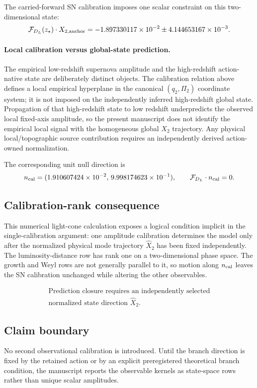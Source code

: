 The carried-forward SN calibration imposes one scalar constraint on this two-dimensional state:
\begin{equation}
\mathcal F_{D_L}(z_\star)\cdot X_{2,\rm anchor}=-1.897330117\times10^{-2}\pm4.144653167\times10^{-3}.
\end{equation}

\paragraph{Local calibration versus global-state prediction.}
The empirical low-redshift supernova amplitude and the high-redshift
action-native state are deliberately distinct objects.  The calibration
relation above defines a local empirical hyperplane in the canonical
$(q_2,\Pi_2)$ coordinate system; it is not imposed on the independently
inferred high-redshift global state.  Propagation of that high-redshift state
to low redshift underpredicts the observed local fixed-axis amplitude, so the
present manuscript does not identify the empirical local signal with the
homogeneous global $X_2$ trajectory.  Any physical local/topographic source
contribution requires an independently derived action-owned normalization.

The corresponding unit null direction is
\begin{equation}
n_{\rm cal}=(1.910607424\times10^{-2},\,9.998174623\times10^{-1}),\qquad \mathcal F_{D_L}\cdot n_{\rm cal}=0.
\end{equation}

\subsection{Calibration-rank consequence}
This numerical light-cone calculation exposes a logical condition implicit in the single-calibration argument: one amplitude calibration determines the model only after the normalized physical mode trajectory $\widehat X_2$ has been fixed independently.
The luminosity-distance row has rank one on a two-dimensional phase space.  The growth and Weyl rows are not generally parallel to it, so motion along $n_{\rm cal}$ leaves the SN calibration unchanged while altering the other observables.

\begin{equation}
\boxed{\begin{gathered}
\text{Prediction closure requires an independently selected}\\
\text{normalized state direction }\widehat X_2.
\end{gathered}}
\end{equation}

\subsection{Claim boundary}
No second observational calibration is introduced.  Until the branch direction is fixed by the retained action or by an explicit preregistered theoretical branch condition, the manuscript reports the observable kernels as state-space rows rather than unique scalar amplitudes.
